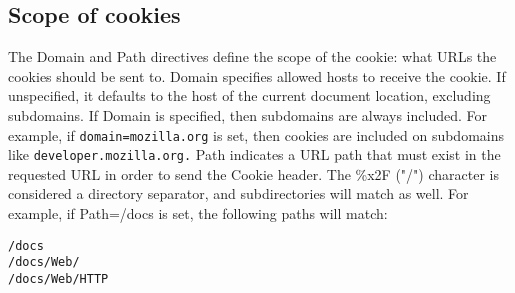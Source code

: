 \subsection{Scope of cookies}
The Domain and Path directives define the scope of the cookie: what URLs the cookies should be sent to.
Domain specifies allowed hosts to receive the cookie. If unspecified, it defaults to the host of the current document location, excluding subdomains. If Domain is specified, then subdomains are always included.
For example, if \verb|domain=mozilla.org| is set, then cookies are included on subdomains like \verb|developer.mozilla.org.|
Path indicates a URL path that must exist in the requested URL in order to send the Cookie header. The \%x2F ("/") character is considered a directory separator, and subdirectories will match as well.
For example, if Path=/docs is set, the following paths will match:

\begin{verbatim}
/docs
/docs/Web/
/docs/Web/HTTP
\end{verbatim}


